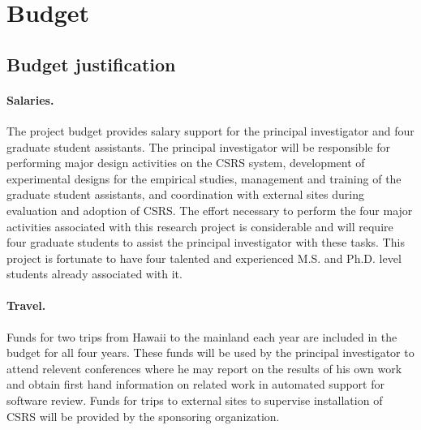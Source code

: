 
\section{Budget}

\subsection{Budget justification}

\paragraph{Salaries.}  The project budget provides salary support for 
the principal investigator and four graduate student assistants.  The
principal investigator will be responsible for performing major design
activities on the CSRS system, development of experimental designs for the
empirical studies, management and training of the graduate student
assistants, and coordination with external sites during evaluation and
adoption of CSRS.  The effort necessary to perform the four major
activities associated with this research project is considerable and will
require four graduate students to assist the principal investigator with
these tasks. This project is fortunate to have four talented and
experienced M.S. and Ph.D. level students already associated with it.

\paragraph{Travel.}  Funds for two trips from Hawaii to the mainland 
each year are included in the budget for all four years.  These funds will
be used by the principal investigator to attend relevent conferences where
he may report on the results of his own work and obtain first hand
information on related work in automated support for software review.
Funds for trips to external sites to supervise installation of CSRS will be
provided by the sponsoring organization.

